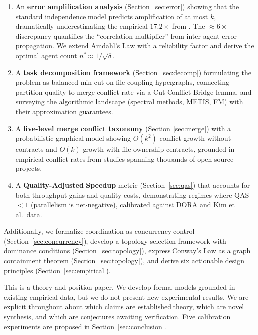 \documentclass[11pt, a4paper, copyright]{googledeepmind}
\begin{document}
\begin{enumerate}[label=(\arabic*)]
  \item An \textbf{error amplification analysis} (Section~\ref{sec:error}) showing that the standard independence model predicts amplification of at most $k$, dramatically underestimating the empirical $17.2\times$ from \citet{Kim2025}. The $\approx 6\times$ discrepancy quantifies the ``correlation multiplier'' from inter-agent error propagation. We extend Amdahl's Law with a reliability factor and derive the optimal agent count $n^* \approx 1/\sqrt{\delta}$.

  \item A \textbf{task decomposition framework} (Section~\ref{sec:decomp}) formulating the problem as balanced min-cut on file-coupling hypergraphs, connecting partition quality to merge conflict rate via a Cut-Conflict Bridge lemma, and surveying the algorithmic landscape (spectral methods, METIS, FM) with their approximation guarantees.

  \item A \textbf{five-level merge conflict taxonomy} (Section~\ref{sec:merge}) with a probabilistic graphical model showing $O(k^2)$ conflict growth without contracts and $O(k)$ growth with file-ownership contracts, grounded in empirical conflict rates from studies spanning thousands of open-source projects.

  \item A \textbf{Quality-Adjusted Speedup} metric (Section~\ref{sec:qas}) that accounts for both throughput gains and quality costs, demonstrating regimes where QAS $< 1$ (parallelism is net-negative), calibrated against DORA and Kim et al.\ data.
\end{enumerate}

Additionally, we formalize coordination as concurrency control (Section~\ref{sec:concurrency}), develop a topology selection framework with dominance conditions (Section~\ref{sec:topology}), express Conway's Law as a graph containment theorem (Section~\ref{sec:topology}), and derive six actionable design principles (Section~\ref{sec:empirical}).

This is a theory and position paper.
We develop formal models grounded in existing empirical data, but we do not present new experimental results.
We are explicit throughout about which claims are established theory, which are novel synthesis, and which are conjectures awaiting verification.
Five calibration experiments are proposed in Section~\ref{sec:conclusion}.
\end{document}
